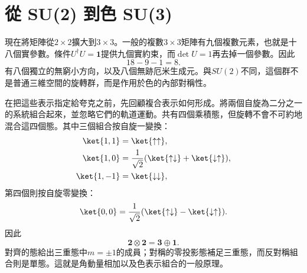 \begin{classroomqa}
\end{classroomqa}

\begin{classroomqa}
\end{classroomqa}

\section{從 SU(2) 到色 SU(3)}

現在將矩陣從\(2\times2\)擴大到\(3\times3\)。一般的複數\(3\times3\)矩陣有九個複數元素，也就是十八個實參數。條件\(U^\dagger U=\boldsymbol 1\)提供九個實約束，而\(\det U=1\)再去掉一個參數。因此
\begin{equation}
18-9-1=8.
\end{equation}
有八個獨立的無窮小方向，以及八個無跡厄米生成元。與\(SU(2)\)不同，這個群不是普通三維空間的旋轉群，而是作用於色的內部對稱性。

在把這些表示指定給夸克之前，先回顧複合表示如何形成。將兩個自旋為二分之一的系統組合起來，並忽略它們的軌道運動。共有四個乘積態，但旋轉不會不可約地混合這四個態。其中三個組合按自旋一變換：
\begin{align}
\ket{1,1}&=\ket{\uparrow\uparrow},\\
\ket{1,0}&=\frac{1}{\sqrt2}
(\ket{\uparrow\downarrow}+\ket{\downarrow\uparrow}),\\
\ket{1,-1}&=\ket{\downarrow\downarrow},
\end{align}
第四個則按自旋零變換：
\begin{equation}
\ket{0,0}=\frac{1}{\sqrt2}
(\ket{\uparrow\downarrow}-\ket{\downarrow\uparrow}).
\end{equation}
因此
\begin{equation}
\boldsymbol 2\otimes\boldsymbol 2
=\boldsymbol 3\oplus\boldsymbol 1.
\label{eq:l4-two-spin-decomposition}
\end{equation}
對齊的態給出三重態中\(m=\pm1\)的成員；對稱的零投影態補足三重態，而反對稱組合則是單態。這就是角動量相加以及色表示組合的一般原理。

